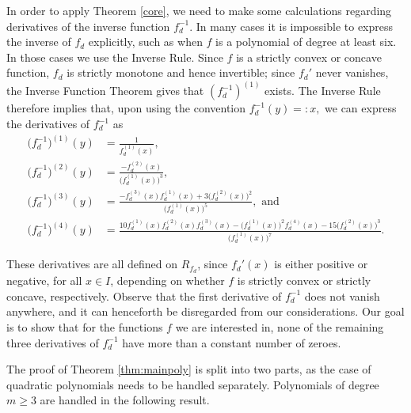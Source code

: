 \documentclass[11pt]{amsart}
\begin{document}
In order to apply Theorem \ref{core}, we need to make some calculations regarding derivatives of the inverse function $f_d^{-1}$. In many cases it is impossible to express the inverse of $f_d$ explicitly, such as when $f$ is a polynomial of degree at least six. In those cases we use the Inverse Rule. Since $f$ is a strictly convex or concave function, $f_d$ is strictly monotone and hence invertible; since $f_d'$ never vanishes, the Inverse Function Theorem gives that $(f_d^{-1})^{(1)}$ exists. The Inverse Rule therefore implies that, upon using the convention $f_d^{-1}(y)=:x,$ we can express the derivatives of $f_d^{-1}$ as
\begin{align} 
\big(f_d^{-1}\big)^{(1)}(y)&=\frac{1}{f_d^{(1)}(x)}, \label{d1} \\
    \big(f_d^{-1}\big)^{(2)}(y)&=\frac{-f_d^{(2)}(x)}{\big(f_d^{(1)}(x)\big)^3},  \label{d2}\\ 
    \big(f_d^{-1}\big)^{(3)}(y)&=\frac{-f_d^{(3)}(x)f_d^{(1)}(x)+3\big(f_d^{(2)}(x)\big)^2}{\big(f_d^{(1)}(x)\big)^5},\text{ and} \label{d3} \\
    \big(f_d^{-1}\big)^{(4)}(y)&=\frac{10f_d^{(1)}(x)f_d^{(2)}(x)f_d^{(3)}(x)-\big(f_d^{(1)}(x)\big)^2f_d^{(4)}(x)-15\big(f_d^{(2)}(x)\big)^3}{\big(f_d^{(1)}(x)\big)^7}. \label{d4}
    \end{align}


    These derivatives are all defined on $R_{f_d}$, since $f_d'(x)$ is either positive or negative, for all $x\in I$, depending on whether $f$ is strictly convex or strictly concave, respectively. Observe that the first derivative of $f_d^{-1}$ does not vanish anywhere, and it can henceforth be disregarded from our considerations. Our goal is to show that for the functions $f$ we are interested in, none of the remaining three derivatives of $f_d^{-1}$ have more than a constant number of zeroes.

    The proof of Theorem \ref{thm:mainpoly} is split into two parts, as the case of quadratic polynomials needs to be handled separately. Polynomials of degree $m \geq 3$ are handled in the following result.
\end{document}
